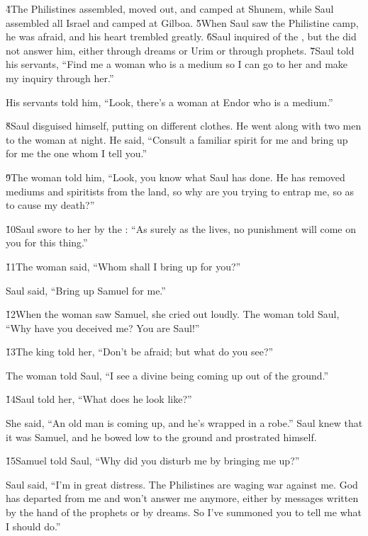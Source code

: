 \v{4}The Philistines assembled, moved out, and camped at Shunem, while Saul assembled all Israel and camped at Gilboa. \v{5}When Saul saw the Philistine camp, he was afraid, and his heart trembled greatly. \v{6}Saul inquired of the , but the  did not answer him, either through dreams or Urim or through prophets. \v{7}Saul told his servants, ``Find me a woman who is a medium so I can go to her and make my inquiry through her.''

His servants told him, ``Look, there's a woman at Endor who is a medium.''

\v{8}Saul disguised himself, putting on different clothes. He went along with two men to the woman at night. He said, ``Consult a familiar spirit for me and bring up for me the one whom I tell you.''

\v{9}The woman told him, ``Look, you know what Saul has done. He has removed mediums and spiritists from the land, so why are you trying to entrap me, so as to cause my death?''

\v{10}Saul swore to her by the : ``As surely as the  lives, no punishment will come on you for this thing.''

\v{11}The woman said, ``Whom shall I bring up for you?''

Saul said, ``Bring up Samuel for me.''

\v{12}When the woman saw Samuel, she cried out loudly. The woman told Saul, ``Why have you deceived me? You are Saul!''

\v{13}The king told her, ``Don't be afraid; but what do you see?''

The woman told Saul, ``I see a divine being coming up out of the ground.''

\v{14}Saul told her, ``What does he look like?''

She said, ``An old man is coming up, and he's wrapped in a robe.'' Saul knew that it was Samuel, and he bowed low to the ground and prostrated himself.

\v{15}Samuel told Saul, ``Why did you disturb me by bringing me up?''

Saul said, ``I'm in great distress. The Philistines are waging war against me. God has departed from me and won't answer me anymore, either by messages written by the hand of the prophets or by dreams. So I've summoned you to tell me what I should do.''

